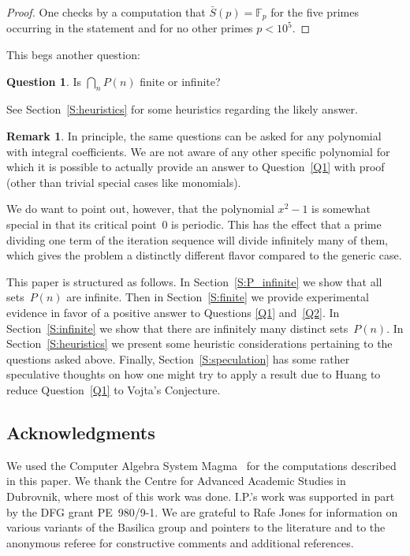 \documentclass[12pt,a4paper]{amsart}
\newcommand{\F}{{\mathbb F}}
\theoremstyle{definition}
\newtheorem{Remark}[Theorem]{Remark}
\newtheorem{Question}[Theorem]{Question}
\numberwithin{equation}{section}
\begin{document}
\begin{proof}
  One checks by a computation that $\bar{S}(p) = \F_p$ for the five primes
    occurring in the statement and for no other primes $p < 10^5$.
\end{proof}

This begs another question:

\begin{Question} \label{Q3}
  Is $\bigcap_n P(n)$ finite or infinite?
\end{Question}

See Section~\ref{S:heuristics} for some heuristics regarding the likely answer.

\begin{Remark}
  In principle, the same questions can be asked for any polynomial with integral
  coefficients. We are not aware of any other specific polynomial for which it
  is possible to actually provide an answer to Question~\ref{Q1} with proof (other than
  trivial special cases like monomials).

  We do want to point out, however, that the polynomial $x^2 - 1$ is somewhat
  special in that its critical point~$0$ is periodic. This has the effect
  that a prime dividing one term of the iteration sequence will divide infinitely
  many of them, which gives the problem a distinctly different flavor compared
  to the generic case.
\end{Remark}

\medskip

This paper is structured as follows. In Section~\ref{S:P_infinite} we show that
all sets~$P(n)$ are infinite. Then in Section~\ref{S:finite} we provide experimental
evidence in favor of a positive answer to Questions \ref{Q1} and~\ref{Q2}.
In Section~\ref{S:infinite} we show that there are infinitely many distinct
sets~$P(n)$. In Section~\ref{S:heuristics} we present some heuristic
considerations pertaining to the questions asked above.
Finally, Section~\ref{S:speculation} has some rather speculative thoughts
on how one might try to apply a result due to Huang to reduce Question~\ref{Q1}
to Vojta's Conjecture.

\subsection*{Acknowledgments}

We used the Computer Algebra System Magma~\cite{Magma} for the computations
described in this paper. We thank the Centre for Advanced Academic Studies in Dubrovnik,
where most of this work was done. I.P.'s work was supported in part by the DFG grant PE~980/9-1.
We are grateful to Rafe Jones for information on various variants of the Basilica group
and pointers to the literature and to the anonymous referee for constructive comments
and additional references.
\end{document}

